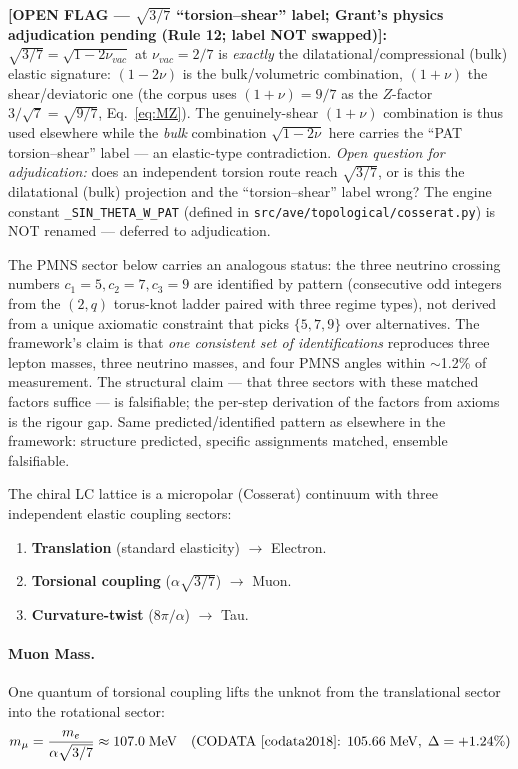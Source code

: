 \noindent\textbf{[OPEN FLAG --- $\sqrt{3/7}$ ``torsion--shear'' label; Grant's physics adjudication pending (Rule 12; label NOT swapped)]:} $\sqrt{3/7} = \sqrt{1 - 2\nu_{vac}}$ at $\nu_{vac} = 2/7$ is \emph{exactly} the dilatational/compressional (bulk) elastic signature: $(1-2\nu)$ is the bulk/volumetric combination, $(1+\nu)$ the shear/deviatoric one (the corpus uses $(1+\nu) = 9/7$ as the $Z$-factor $3/\sqrt{7} = \sqrt{9/7}$, Eq.~\ref{eq:MZ}). The genuinely-shear $(1+\nu)$ combination is thus used elsewhere while the \emph{bulk} combination $\sqrt{1-2\nu}$ here carries the ``PAT torsion--shear'' label --- an elastic-type contradiction. \emph{Open question for adjudication:} does an independent torsion route reach $\sqrt{3/7}$, or is this the dilatational (bulk) projection and the ``torsion--shear'' label wrong? The engine constant \texttt{\_SIN\_THETA\_W\_PAT} (defined in \texttt{src/ave/topological/cosserat.py}) is NOT renamed --- deferred to adjudication.

\smallskip
\noindent The PMNS sector below carries an analogous status: the three neutrino crossing numbers $c_1=5, c_2=7, c_3=9$ are identified by pattern (consecutive odd integers from the $(2,q)$ torus-knot ladder paired with three regime types), not derived from a unique axiomatic constraint that picks $\{5,7,9\}$ over alternatives. The framework's claim is that \emph{one consistent set of identifications} reproduces three lepton masses, three neutrino masses, and four PMNS angles within $\sim$1.2\% of measurement. The structural claim --- that three sectors with these matched factors suffice --- is falsifiable; the per-step derivation of the factors from axioms is the rigour gap. Same predicted/identified pattern as elsewhere in the framework: structure predicted, specific assignments matched, ensemble falsifiable.

The chiral LC lattice is a micropolar (Cosserat) continuum with three
independent elastic coupling sectors:
\begin{enumerate}
    \item \textbf{Translation} (standard elasticity) $\to$ Electron.
    \item \textbf{Torsional coupling} ($\alpha\sqrt{3/7}$) $\to$ Muon.
    \item \textbf{Curvature-twist} ($8\pi/\alpha$) $\to$ Tau.
\end{enumerate}

\paragraph{Muon Mass.}
One quantum of torsional coupling lifts the unknot from the translational
sector into the rotational sector:
\begin{equation}
    m_\mu = \frac{m_e}{\alpha\sqrt{3/7}}
    \approx 107.0\;\text{MeV}
    \quad\text{(CODATA~\cite{codata2018}: } 105.66\;\text{MeV},\; \Delta = +1.24\%\text{)}
    \label{eq:muon}
\end{equation}

